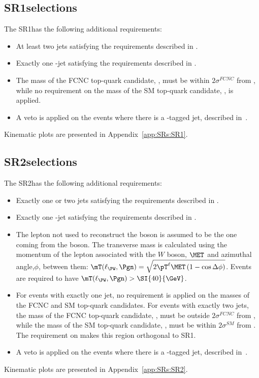 \subsection{SR1\tZc selections}
\label{sec:sel:sr1}
The SR1\tZc has the following additional requirements:
\begin{itemize}
	\item At least two jets satisfying the requirements described in 
	. 
	\item Exactly one \Pqb-jet satisfying the requirements
	described in . 
	\item The mass of the FCNC top-quark candidate,
	\mtopfcnc, must be within $2\sigma^{FCNC}$ from \mtopvalue, while no
	requirement on the mass of the SM top-quark candidate, \mtopsm, is applied.
	\item A veto is applied on the events where there is a \Pqc-tagged jet, described in~.
\end{itemize}
Kinematic plots are presented in Appendix~\ref{app:SRs:SR1}.

\subsection{SR2\tZc selections}
\label{sec:sel:sr2}

The SR2\tZc has the following additional requirements:
\begin{itemize}
	\item Exactly one or two jets satisfying the requirements described in 
	. 
	\item Exactly one \Pqb-jet satisfying the requirements
	described in . 
	\item The lepton not used to reconstruct the \PZ boson is assumed to be
	the one coming from the \PW boson.
	The transverse mass is calculated using the momentum of the lepton associated with the $W$ boson, $\MET$ and azimuthal angle,$\phi$, between them: 
	$\mT(\ell_{\PW},\Pgn) = \sqrt{2\pT^{\ell}\MET \left(1-\cos\Delta\phi\right)}$.
	Events are required to have $\mT(\ell_{\PW},\Pgn) > \SI{40}{\GeV}$.
	\item For events with exactly one jet, no
	requirement is applied on the masses of the FCNC and SM top-quark
	candidates. For events with exactly two jets, the mass of the FCNC
	top-quark candidate, \mtopfcnc, must be outside $2\sigma^{FCNC}$
	from \mtopvalue, while the mass of the SM top-quark candidate,
	\mtopsm, must be within $2\sigma^{SM}$ from \mtopvalue. The
	requirement on \mtopfcnc makes this region orthogonal to SR1.
	\item A veto is applied on the events where there is a \Pqc-tagged jet, described in~.
\end{itemize}
Kinematic plots are presented in Appendix~\ref{app:SRs:SR2}.

